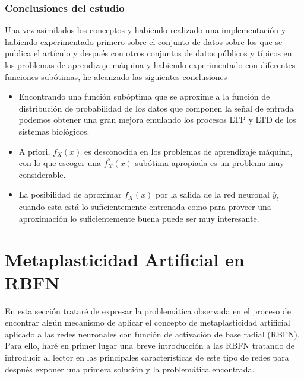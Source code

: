 \documentclass[10pt,a4paper]{report}
\begin{document}
\subsubsection{Conclusiones del estudio}
Una vez asimilados los conceptos y habiendo realizado una implementación y habiendo experimentado primero sobre el conjunto de datos sobre los que se publica el artículo y después con otros conjuntos de datos públicos y típicos en los problemas de aprendizaje máquina y habiendo experimentado con diferentes funciones subótimas, he alcanzado las siguientes conclusiones
\begin{itemize}
	\item Encontrando una función subóptima que se aproxime a la función de distribución de probabilidad de los datos que componen la señal de entrada podemos obtener una gran mejora emulando los procesos LTP y LTD de los sistemas biológicos.
	\item A priori, $f_X(x)$ es desconocida en los problemas de aprendizaje máquina, con lo que escoger una $f^*_X(x)$ subótima apropiada es un problema muy considerable.
	\item La posibilidad de aproximar $f_X(x)$ por la salida de la red neuronal $\widehat{y}_l$ cuando esta está lo suficientemente entrenada como para proveer una aproximación lo suficientemente buena puede ser muy interesante.
\end{itemize}

\section{Metaplasticidad Artificial en RBFN}
En esta sección trataré de expresar la problemática observada en el proceso de encontrar algún mecanismo de aplicar el concepto de metaplasticidad artificial aplicado a las redes neuronales con función de activación de base radial (RBFN). Para ello, haré en primer lugar una breve introducción a las RBFN tratando de introducir al lector en las principales características de este tipo de redes para después exponer una primera solución y la problemática encontrada.
\end{document}
